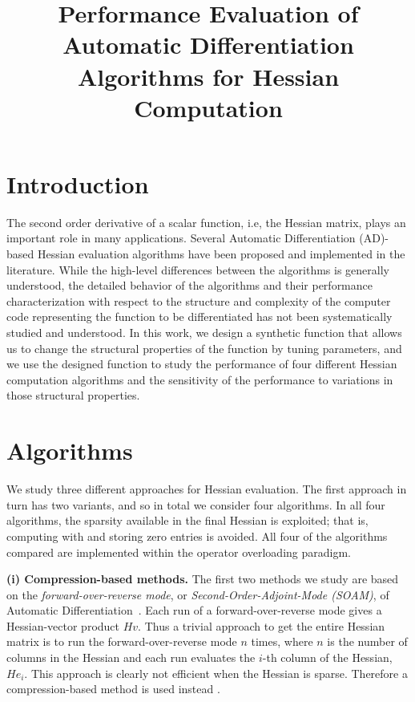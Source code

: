 \documentclass[final,leqno,onefignum,onetabnum]{siamart}
\begin{document}
\title{Performance Evaluation of Automatic Differentiation Algorithms for Hessian Computation}
\maketitle

\section*{Introduction}
The second order derivative of a scalar function, i.e, the Hessian matrix, plays 
an important role in many applications. 
Several Automatic Differentiation (AD)-based Hessian evaluation algorithms have been proposed and implemented in the literature. While the high-level differences between the algorithms is generally understood, the detailed behavior of the algorithms and their performance characterization with respect to the structure and complexity of the computer code  representing the function to be differentiated has not been systematically studied and understood. In this work, we design a synthetic function that allows us to change the structural properties of the function by tuning parameters, and we use the designed function to study the performance of four different Hessian computation algorithms and the sensitivity of the performance to variations in those structural properties.

\section*{Algorithms}

We study three different approaches for Hessian evaluation. The first approach in turn has two variants, and so in total we consider four algorithms. In all four algorithms, 
the sparsity available in the final Hessian is exploited; that is, computing with and storing zero entries is avoided. All four of the algorithms compared are implemented within the operator overloading paradigm. 

{\bf (i) Compression-based methods. }
The first two methods we study are based on the {\em forward-over-reverse mode}, or {\em Second-Order-Adjoint-Mode (SOAM)}, of Automatic Differentiation~\cite{griewank2008evaluating, naumann2012art}. Each run of a forward-over-reverse mode gives a Hessian-vector product $Hv$. Thus a trivial approach to get the entire Hessian matrix is to run the forward-over-reverse mode $n$ times, where $n$ is the number of columns in the Hessian and each run evaluates the $i$-th column of the Hessian, $He_i$. This approach is clearly not efficient  when the Hessian is sparse.  Therefore a compression-based method is used instead \cite{gebremedhin2009efficient}. 
\end{document}
